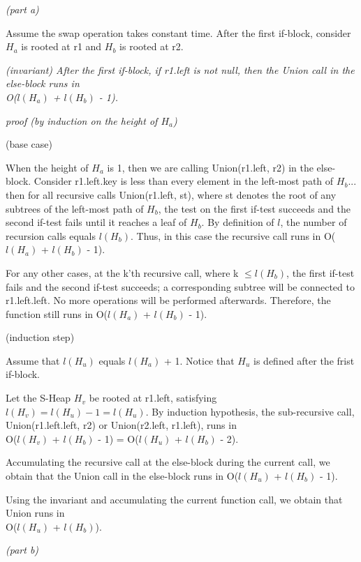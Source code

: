\documentclass[a4paper, 10pt]{article}
\begin{document}
{\setmainfont{Arial}
{\noindent\large\it(part a)}

Assume the swap operation takes constant time. After the first if-block, consider $H_a$ is rooted at r1 and $H_b$ is rooted at r2.

{\it
(invariant) After the first if-block, if r1.left is not null, then the Union call in the else-block runs in \\\indent\indent O($l(H_a)$ + $l(H_b)$ - 1).
}
\begin{addmargin}[15pt]{0in}
{
\textit{proof (by induction on the height of $H_a$)}

{\noindent (base case)}

When the height of $H_a$ is 1, then we are calling Union(r1.left, r2) in the else-block. Consider r1.left.key is less than every element in the left-most path of $H_b$... then for all recursive calls Union(r1.left, st), where st denotes the root of any subtrees of the left-most path of $H_b$, the test on the first if-test succeeds and the second if-test fails until it reaches a leaf of $H_b$. By definition of $l$, the number of recursion calls equals $l(H_b)$. Thus, in this case the recursive call runs in O($l(H_a)$ + $l(H_b)$ - 1).

For any other cases, at the k'th recursive call, where k $\le l(H_b)$, the first if-test fails and the second if-test succeeds; a corresponding subtree will be connected to r1.left.left. No more operations will be performed afterwards. Therefore, the function still runs in O($l(H_a)$ + $l(H_b)$ - 1).

{\noindent (induction step)}

Assume that $l(H_u)$ equals $l(H_a)$ + 1. Notice that $H_u$ is defined after the frist if-block.

Let the S-Heap $H_v$ be rooted at r1.left, satisfying $l(H_v) = l(H_u) - 1 = l(H_u)$. By induction hypothesis, the sub-recursive call, Union(r1.left.left, r2) or Union(r2.left, r1.left), runs in \\O($l(H_v)$ + $l(H_b)$ - 1) = O($l(H_u)$ + $l(H_b)$ - 2).

Accumulating the recursive call at the else-block during the current call, we obtain that the Union call in the else-block runs in O($l(H_u)$ + $l(H_b)$ - 1).
}
\end{addmargin}

Using the invariant and accumulating the current function call, we obtain that Union runs in \\O($l(H_u)$ + $l(H_b)$).

{\noindent\large\it(part b)}
}
~\\\\
\end{document}
